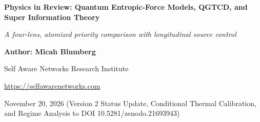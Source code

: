 \documentclass[
  american,
  11pt,
  letterpaper,
]{article}
\author{}
\date{}
\begin{document}
\begin{center}

{\LARGE\bfseries Physics in Review: Quantum Entropic-Force Models, QGTCD, and Super Information Theory\par}

\vspace{0.35em}

{\large\itshape A four-lens, atomized priority comparison with longitudinal source control\par}

\vspace{0.8em}

{\small\textbf{Author: Micah Blumberg}\par}

{\small Self Aware Networks Research Institute\par}

{\small\url{https://selfawarenetworks.com}\par}

{\small November 20, 2026 (Version 2 Status Update, Conditional Thermal Calibration, and Regime Analysis to DOI 10.5281/zenodo.21693943)\par}

\end{center}

\vspace{0.65em}
\end{document}
